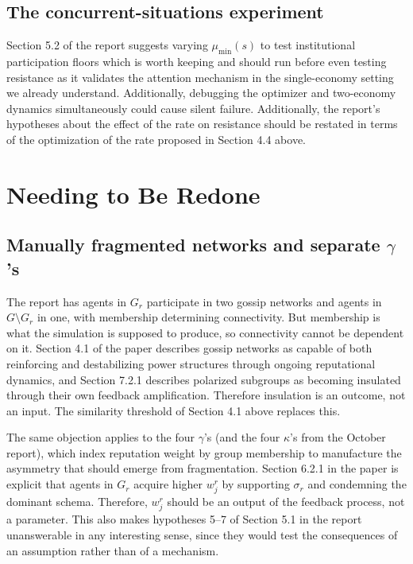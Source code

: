 \documentclass[12pt]{article}
\begin{document}
\subsection{The concurrent-situations experiment}
Section 5.2 of the report suggests varying $\mu_\text{min}(s)$ to test institutional participation floors which is worth keeping and
should run before even testing resistance as it validates the attention mechanism in the single-economy
setting we already understand. Additionally, debugging the optimizer and two-economy dynamics simultaneously could cause
silent failure. Additionally, the report's hypotheses about the effect of the rate on resistance should be restated in terms of the optimization of the rate proposed in Section 4.4 above.

\section{Needing to Be Redone}
 
\subsection{Manually fragmented networks and separate $\gamma$'s}
The report has agents in $G_r$ participate in two gossip networks and agents in $G\setminus G_r$ in one,
with membership determining connectivity. But membership is what the simulation is supposed to produce, so
connectivity cannot be dependent on it. Section 4.1 of the paper describes gossip networks as capable of
both reinforcing and destabilizing power structures through ongoing reputational dynamics, and Section 7.2.1
describes polarized subgroups as becoming insulated through their own feedback amplification. Therefore insulation
is an outcome, not an input. The similarity threshold of Section 4.1 above replaces this.
 
The same objection applies to the four $\gamma$'s (and the four $\kappa$'s from the October report), which
index reputation weight by group membership to manufacture the asymmetry that should emerge from
fragmentation. Section 6.2.1 in the paper is explicit that agents in $G_r$ acquire higher $w^r_j$ by supporting
$\sigma_r$ and condemning the dominant schema. Therefore, $w^r_j$ should be an output of the feedback process, not a
parameter. This also makes hypotheses 5--7 of Section 5.1 in the report unanswerable in any interesting sense, since they
would test the consequences of an assumption rather than of a mechanism.
\end{document}
